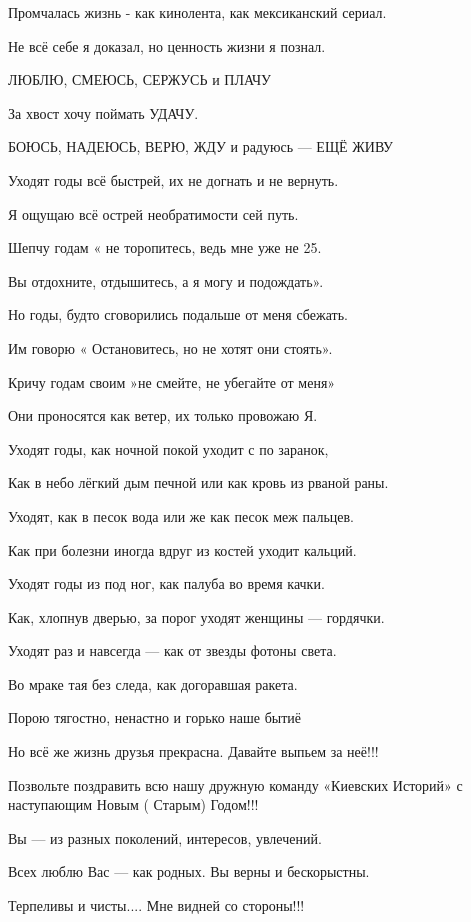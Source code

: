 Промчалась жизнь - как кинолента, как мексиканский сериал.

Не всё себе я доказал, но ценность жизни я познал.

ЛЮБЛЮ, СМЕЮСЬ, СЕРЖУСЬ и ПЛАЧУ

За хвост хочу поймать УДАЧУ.

БОЮСЬ, НАДЕЮСЬ, ВЕРЮ, ЖДУ и радуюсь — ЕЩЁ ЖИВУ

Уходят годы всё быстрей, их не догнать и не вернуть.

Я ощущаю всё острей необратимости сей путь.

Шепчу годам « не торопитесь, ведь мне уже не 25.

Вы отдохните, отдышитесь, а я могу и подождать».

Но годы, будто сговорились подальше от меня сбежать.

Им говорю « Остановитесь, но не хотят они стоять».

Кричу годам своим »не смейте, не убегайте от меня»

Они проносятся как ветер, их только провожаю Я.

Уходят годы, как ночной покой уходит с по заранок,

Как в небо лёгкий дым печной или как кровь из рваной раны.

Уходят, как в песок вода или же как песок меж пальцев.

Как при болезни иногда вдруг из костей уходит кальций.

Уходят годы из под ног, как палуба во время качки.

Как, хлопнув дверью, за порог уходят женщины — гордячки.

Уходят раз и навсегда — как от звезды фотоны света.

Во мраке тая без следа, как догоравшая  ракета.

Порою тягостно, ненастно и горько наше бытиё

Но всё же жизнь друзья прекрасна. Давайте выпьем за неё!!!

Позвольте поздравить всю нашу дружную команду «Киевских Историй» с наступающим
Новым  ( Старым) Годом!!!

Вы — из разных поколений, интересов, увлечений. 

Всех люблю Вас — как родных. Вы верны и бескорыстны.

Терпеливы и чисты.... Мне видней со стороны!!!
